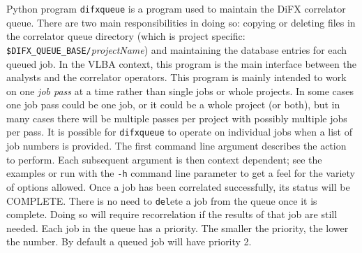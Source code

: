 Python program {\tt difxqueue} is a program used to maintain the DiFX correlator queue.
There are two main responsibilities in doing so: copying or deleting files in the correlator queue directory (which is project specific: {\tt \$DIFX\_QUEUE\_BASE/}{\em projectName}) and maintaining the database entries for each queued job.
In the VLBA context, this program is the main interface between the analysts and the correlator operators.
This program is mainly intended to work on one {\em job pass} at a time rather than single jobs or whole projects.
In some cases one job pass could be one job, or it could be a whole project (or both), but in many cases there will be multiple passes per project with possibly multiple jobs per pass.
It is possible for {\tt difxqueue} to operate on individual jobs when a list of job numbers is provided.
The first command line argument describes the action to perform.
Each subsequent argument is then context dependent; see the examples or run with the {\tt -h} command line parameter to get a feel for the variety of options allowed.
Once a job has been correlated successfully, its status will be COMPLETE.
There is no need to {\tt del}ete a job from the queue once it is complete. 
Doing so will require recorrelation if the results of that job are still needed.
Each job in the queue has a priority.
The smaller the priority, the lower the number.
By default a queued job will have priority 2.

